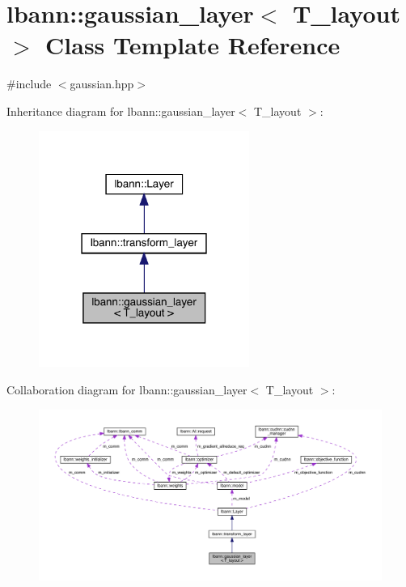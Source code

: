 \hypertarget{classlbann_1_1gaussian__layer}{}\section{lbann\+:\+:gaussian\+\_\+layer$<$ T\+\_\+layout $>$ Class Template Reference}
\label{classlbann_1_1gaussian__layer}


{\ttfamily \#include $<$gaussian.\+hpp$>$}



Inheritance diagram for lbann\+:\+:gaussian\+\_\+layer$<$ T\+\_\+layout $>$\+:\nopagebreak
\begin{figure}[H]
\begin{center}
\leavevmode
\includegraphics[width=195pt]{classlbann_1_1gaussian__layer__inherit__graph}
\end{center}
\end{figure}


Collaboration diagram for lbann\+:\+:gaussian\+\_\+layer$<$ T\+\_\+layout $>$\+:\nopagebreak
\begin{figure}[H]
\begin{center}
\leavevmode
\includegraphics[width=350pt]{classlbann_1_1gaussian__layer__coll__graph}
\end{center}
\end{figure}
